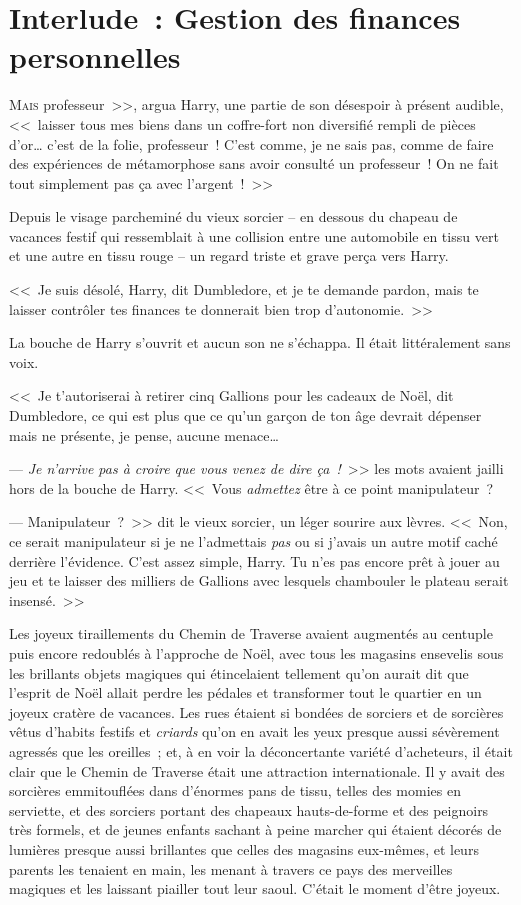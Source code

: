 \chapter{Interlude~: Gestion des finances personnelles}

\lettrine[ante=<<~]{M}{ais} professeur~>>, argua Harry, une partie de son désespoir à présent audible, <<~laisser tous mes biens dans un coffre-fort non diversifié rempli de pièces d'or… c'est de la folie, professeur~! C'est comme, je ne sais pas, comme de faire des expériences de métamorphose sans avoir consulté un professeur~! On ne fait tout simplement pas ça avec l'argent~!~>>

Depuis le visage parcheminé du vieux sorcier -- en dessous du chapeau de vacances festif qui ressemblait à une collision entre une automobile en tissu vert et une autre en tissu rouge -- un regard triste et grave perça vers Harry.

<<~Je suis désolé, Harry, dit Dumbledore, et je te demande pardon, mais te laisser contrôler tes finances te donnerait bien trop d'autonomie.~>>

La bouche de Harry s'ouvrit et aucun son ne s'échappa. Il était littéralement sans voix.

<<~Je t'autoriserai à retirer cinq Gallions pour les cadeaux de Noël, dit Dumbledore, ce qui est plus que ce qu'un garçon de ton âge devrait dépenser mais ne présente, je pense, aucune menace…

--- \emph{Je n'arrive pas à croire que vous venez de dire ça~!}~>> les mots avaient jailli hors de la bouche de Harry. <<~Vous \emph{admettez} être à ce point manipulateur~?

--- Manipulateur~?~>> dit le vieux sorcier, un léger sourire aux lèvres. <<~Non, ce serait manipulateur si je ne l'admettais \emph{pas} ou si j'avais un autre motif caché derrière l'évidence. C'est assez simple, Harry. Tu n'es pas encore prêt à jouer au jeu et te laisser des milliers de Gallions avec lesquels chambouler le plateau serait insensé.~>>

\later

Les joyeux tiraillements du Chemin de Traverse avaient augmentés au centuple puis encore redoublés à l'approche de Noël, avec tous les magasins ensevelis sous les brillants objets magiques qui étincelaient tellement qu'on aurait dit que l'esprit de Noël allait perdre les pédales et transformer tout le quartier en un joyeux cratère de vacances. Les rues étaient si bondées de sorciers et de sorcières vêtus d'habits festifs et \emph{criards} qu'on en avait les yeux presque aussi sévèrement agressés que les oreilles~; et, à en voir la déconcertante variété d'acheteurs, il était clair que le Chemin de Traverse était une attraction internationale. Il y avait des sorcières emmitouflées dans d'énormes pans de tissu, telles des momies en serviette, et des sorciers portant des chapeaux hauts-de-forme et des peignoirs très formels, et de jeunes enfants sachant à peine marcher qui étaient décorés de lumières presque aussi brillantes que celles des magasins eux-mêmes, et leurs parents les tenaient en main, les menant à travers ce pays des merveilles magiques et les laissant piailler tout leur saoul. C'était le moment d'être joyeux.

